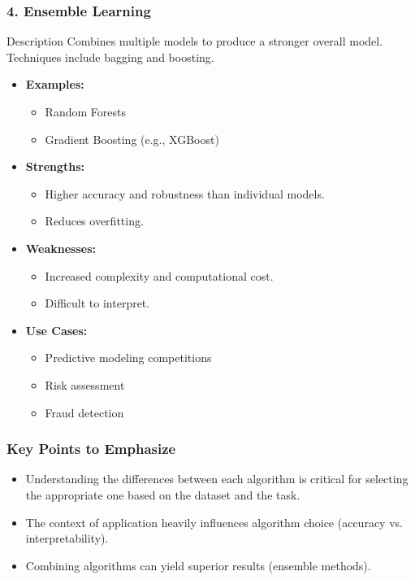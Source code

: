 \documentclass[aspectratio=169]{beamer}
\begin{document}
\begin{frame}[fragile]
    \frametitle{4. Ensemble Learning}
    \begin{block}{Description}
        Combines multiple models to produce a stronger overall model. Techniques include bagging and boosting.
    \end{block}
    \begin{itemize}
        \item \textbf{Examples:}
            \begin{itemize}
                \item Random Forests
                \item Gradient Boosting (e.g., XGBoost)
            \end{itemize}
        \item \textbf{Strengths:}
            \begin{itemize}
                \item Higher accuracy and robustness than individual models.
                \item Reduces overfitting.
            \end{itemize}
        \item \textbf{Weaknesses:}
            \begin{itemize}
                \item Increased complexity and computational cost.
                \item Difficult to interpret.
            \end{itemize}
        \item \textbf{Use Cases:}
            \begin{itemize}
                \item Predictive modeling competitions
                \item Risk assessment
                \item Fraud detection
            \end{itemize}
    \end{itemize}
\end{frame}

\begin{frame}[fragile]
    \frametitle{Key Points to Emphasize}
    \begin{itemize}
        \item Understanding the differences between each algorithm is critical for selecting the appropriate one based on the dataset and the task.
        \item The context of application heavily influences algorithm choice (accuracy vs. interpretability).
        \item Combining algorithms can yield superior results (ensemble methods).
    \end{itemize}
\end{frame}
\end{document}
